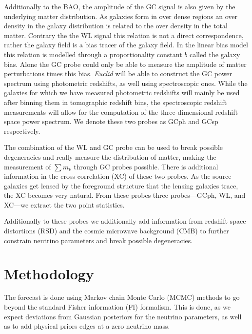 \documentclass[a4paper,11pt]{article}
\newcommand{\euclid}{\textit{Euclid}\xspace}
\newcommand{\summnu}{\sum m_\nu}
\begin{document}
Additionally to the BAO, the amplitude of the GC signal is also given by the underlying matter distribution. As galaxies form in over dense regions an over density in the galaxy distribution is related to the over density in the total matter. Contrary the the WL signal this relation is not a direct correspondence, rather the galaxy field is a bias tracer of the galaxy field. In the linear bias model this relation is modelled through a proportionality constant $b$ called the galaxy bias. Alone the GC probe could only be able to measure the amplitude of matter perturbations times this bias. \euclid will be able to construct the GC power spectrum using photometric redshifts, as well using spectroscopic ones. While the galaxies for which we have measured photometric redshifts will mainly be used after binning them in tomographic redshift bins, the spectroscopic redshift measurements will allow for the computation of the three-dimensional redshift space power spectrum. We denote these two probes as GCph and GCsp respectively.

The combination of the WL and GC probe can be used to break possible degeneracies and really measure the distribution of matter, making the measurement of $\summnu$ through GC probes possible. There is additional information in the cross correlation (XC) of these two probes. As the source galaxies get lensed by the foreground structure that the lensing galaxies trace, the XC becomes very natural. From these probes three probes---GCph, WL, and XC---we extract the two point statistics.

Additionally to these probes we additionally add information from redshift space distortions (RSD) and the cosmic microwave background (CMB) to further constrain neutrino parameters and break possible degeneracies.

\section{Methodology}

The forecast is done using Markov chain Monte Carlo (MCMC) methods to go beyond the standard Fisher information (FI) formalism. This is done, as we expect deviations from Gaussian posteriors for the neutrino parameters, as well as to add physical priors edges at a zero neutrino mass.
\end{document}
